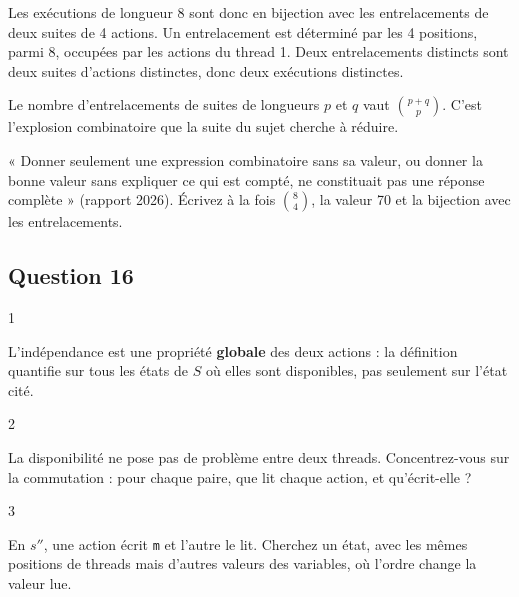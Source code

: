 \documentclass[11pt,a4paper]{article}
\newcommand{\equationajustee}[1]{%
  \sbox{\boiteequation}{$\displaystyle #1$}%
  \ifdim\wd\boiteequation>\linewidth
    \[\resizebox{\linewidth}{!}{\usebox{\boiteequation}}\]%
  \else
    \[#1\]%
  \fi}
\begin{document}
Les exécutions de longueur 8 sont donc en bijection avec les entrelacements de deux suites de 4 actions. Un entrelacement est déterminé par les 4 positions, parmi 8, occupées par les actions du thread 1. Deux entrelacements distincts sont deux suites d'actions distinctes, donc deux exécutions distinctes.

\equationajustee{\boxed{\binom{8}{4}=70 \text{ \text{exécutions}}}}

\begin{methode}

Le nombre d'entrelacements de suites de longueurs \(p\) et \(q\) vaut \(\binom{p+q}{p}\). C'est l'explosion combinatoire que la suite du sujet cherche à réduire.

\end{methode}

\begin{jury}

« Donner seulement une expression combinatoire sans sa valeur, ou donner la bonne valeur sans expliquer ce qui est compté, ne constituait pas une réponse complète » (rapport 2026). Écrivez à la fois \(\binom{8}{4}\), la valeur 70 et la bijection avec les entrelacements.

\end{jury}

\hypertarget{question-16}{%
\subsection{Question 16}\label{question-16}}

\begin{indication}{1}

L'indépendance est une propriété \textbf{globale} des deux actions : la définition quantifie sur tous les états de \(S\) où elles sont disponibles, pas seulement sur l'état cité.

\end{indication}

\begin{indication}{2}

La disponibilité ne pose pas de problème entre deux threads. Concentrez-vous sur la commutation : pour chaque paire, que lit chaque action, et qu'écrit-elle ?

\end{indication}

\begin{indication}{3}

En \(s''\), une action écrit \texttt{m} et l'autre le lit. Cherchez un état, avec les mêmes positions de threads mais d'autres valeurs des variables, où l'ordre change la valeur lue.

\end{indication}
\end{document}
